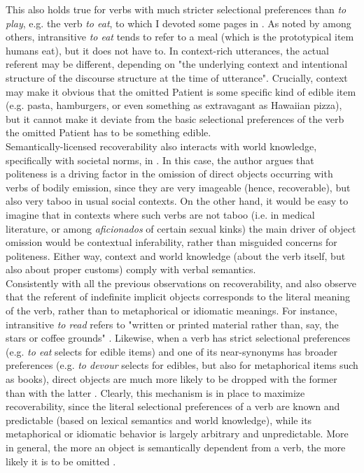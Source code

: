 This also holds true for verbs with much stricter selectional preferences than \textit{to play}, e.g. the verb \textit{to eat}, to which I devoted some pages in . As noted by \textcite[149]{Cote1996} among others, intransitive \textit{to eat} tends to refer to a meal (which is the prototypical item humans eat), but it does not have to. In context-rich utterances, the actual referent may be different, depending on "the underlying context and intentional structure of the discourse structure at the time of utterance". Crucially, context may make it obvious that the omitted Patient is some specific kind of edible item (e.g. pasta, hamburgers, or even something as extravagant as Hawaiian pizza), but it cannot make it deviate from the basic selectional preferences of the verb \textemdash the omitted Patient has to be something edible.\\
Semantically-licensed recoverability also interacts with world knowledge, specifically with societal norms, in \textcite{Goldberg2005}. In this case, the author argues that politeness is a driving factor in the omission of direct objects occurring with verbs of bodily emission, since they are very imageable (hence, recoverable), but also very taboo in usual social contexts. On the other hand, it would be easy to imagine that in contexts where such verbs are not taboo (i.e. in medical literature, or among \textit{aficionados} of certain sexual kinks) the main driver of object omission would be contextual inferability, rather than misguided concerns for politeness. Either way, context and world knowledge (about the verb itself, but also about proper customs) comply with verbal semantics.\\
Consistently with all the previous observations on recoverability, \textcite{Mittwoch2005} and \textcite{Glass2013} also observe that the referent of indefinite implicit objects corresponds to the literal meaning of the verb, rather than to metaphorical or idiomatic meanings. For instance, intransitive \textit{to read} refers to "written or printed material rather than, say, the stars or coffee grounds" \parencite[2]{Mittwoch2005}. Likewise, when a verb has strict selectional preferences (e.g. \textit{to eat} selects for edible items) and one of its near-synonyms has broader preferences (e.g. \textit{to devour} selects for edibles, but also for metaphorical items such as books), direct objects are much more likely to be dropped with the former than with the latter \parencite[5]{Glass2013}. Clearly, this mechanism is in place to maximize recoverability, since the literal selectional preferences of a verb are known and predictable (based on lexical semantics and world knowledge), while its metaphorical or idiomatic behavior is largely arbitrary and unpredictable. More in general, the more an object is semantically dependent from a verb, the more likely it is to be omitted \parencite[203-204]{Rice1988}.


